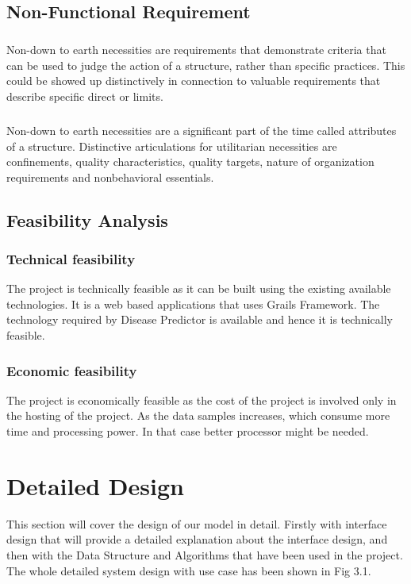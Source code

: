 \documentclass{book}
\begin{document}
    	
    	\section{Non-Functional Requirement}
    	\paragraph{}
    	Non-down to earth necessities are requirements that demonstrate criteria that can be used to judge the action of a structure, rather than specific practices. This could be showed up distinctively in connection to valuable requirements that describe specific direct or limits.
    	\paragraph{}
    	Non-down to earth necessities are a significant part of the time called attributes of a structure. Distinctive articulations for utilitarian necessities are confinements, quality characteristics, quality targets, nature of organization requirements and nonbehavioral essentials.
    	
    	\section{Feasibility Analysis}
    	\subsection{Technical feasibility} 
    	The project is technically feasible as it can be built using the existing available technologies. It is a web based applications that uses Grails Framework. The technology required by Disease Predictor is available and hence it is technically feasible.
    	
    	\subsection{Economic feasibility} 
    	The project is economically feasible as the cost of the project is involved only in the hosting of the project. As the data samples increases, which consume more time and processing power. In that case better processor might be needed.
    	
    	\chapter{Detailed Design}
    	This section will cover the design of our model in detail. Firstly with interface design that will provide a detailed explanation about the interface design, and then with the Data Structure and Algorithms that have been used in the project. The whole detailed system design with use case has been shown in Fig 3.1.
    	
\end{document}
